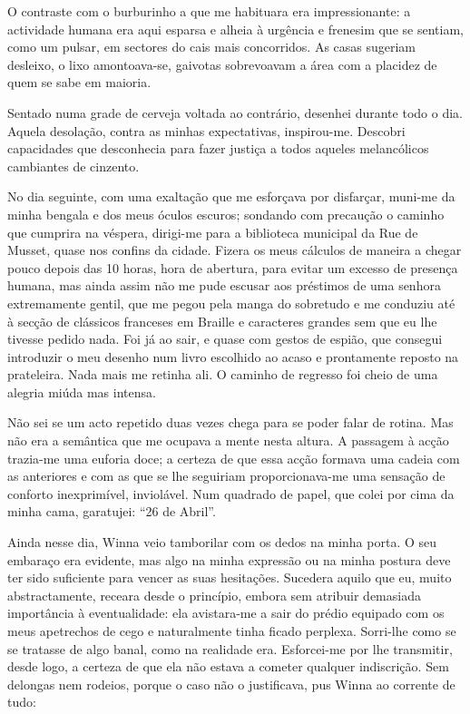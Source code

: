 O contraste com o burburinho a que me habituara era
impressionante: a actividade humana era aqui esparsa e alheia à urgência
e frenesim que se sentiam, como um pulsar, em sectores do cais mais
concorridos. As casas sugeriam desleixo, o lixo amontoava-se, gaivotas
sobrevoavam a área com a placidez de quem se sabe em maioria.

Sentado numa grade de cerveja voltada ao contrário, desenhei durante
todo o dia. Aquela desolação, contra as minhas expectativas,
inspirou-me. Descobri capacidades que desconhecia para fazer justiça a
todos aqueles melancólicos cambiantes de cinzento.

No dia seguinte, com uma exaltação que me esforçava por disfarçar,
muni-me da minha bengala e dos meus óculos escuros; sondando com
precaução o caminho que cumprira na véspera, dirigi-me para a biblioteca
municipal da Rue de Musset, quase nos confins da cidade. Fizera os meus
cálculos de maneira a chegar pouco depois das 10 horas, hora de abertura, para evitar um excesso de presença humana, mas ainda assim não me
pude escusar aos préstimos de uma senhora extremamente gentil, que me
pegou pela manga do sobretudo e me conduziu até à secção de clássicos
franceses em Braille e caracteres grandes sem que eu lhe tivesse pedido
nada. Foi já ao sair, e quase com gestos de espião, que consegui
introduzir o meu desenho num livro escolhido ao acaso e prontamente
reposto na prateleira. Nada mais me retinha ali. O caminho de regresso
foi cheio de uma alegria miúda mas intensa.

Não sei se um acto repetido duas vezes chega para se poder falar de
rotina. Mas não era a semântica que me ocupava a mente nesta altura. A
passagem à acção trazia-me uma euforia doce; a certeza de que essa acção
formava uma cadeia com as anteriores e com as que se lhe seguiriam
proporcionava-me uma sensação de conforto inexprimível, inviolável. Num
quadrado de papel, que colei por cima da minha cama, garatujei: ``26
de Abril''.

Ainda nesse dia, Winna veio tamborilar com os dedos na minha porta. O
seu embaraço era evidente, mas algo na minha expressão ou na minha
postura deve ter sido suficiente para vencer as suas hesitações.
Sucedera aquilo que eu, muito abstractamente, receara desde o princípio,
embora sem atribuir demasiada importância à eventualidade: ela avistara-me
a sair do prédio equipado com os meus apetrechos de cego e
naturalmente tinha ficado perplexa. Sorri-lhe como se se tratasse de
algo banal, como na realidade era. Esforcei-me por lhe transmitir, desde
logo, a certeza de que ela não estava a cometer qualquer indiscrição.
Sem delongas nem rodeios, porque o caso não o justificava, pus Winna ao
corrente de tudo:

